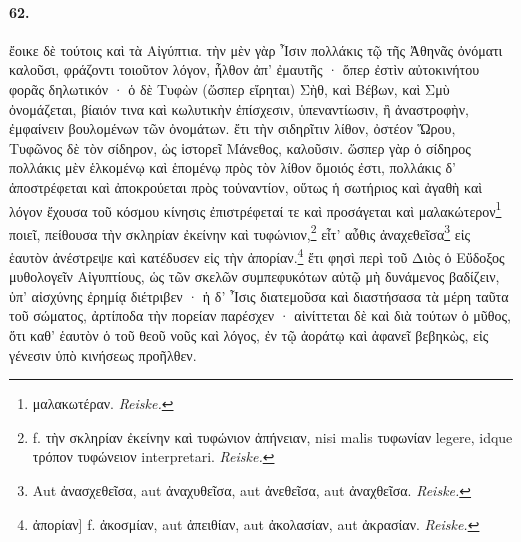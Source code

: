 \documentclass[a4paper, 11pt, oneside, polutonikogreek, german]{article}
\begin{document}
\paragraph{62.}
ἔοικε δὲ τούτοις καὶ τὰ Αἰγύπτια. τὴν μὲν γὰρ Ἶσιν πολλάκις τῷ τῆς Ἀθηνᾶς ὀνόματι καλοῦσι, φράζοντι τοιοῦτον λόγον, ἦλθον ἀπ' ἐμαυτῆς · ὅπερ ἐστὶν αὐτοκινήτου φορᾶς δηλωτικόν · ὁ δὲ Τυφὼν (ὥσπερ εἴρηται) Σὴθ, καὶ Βέβων, καὶ Σμὺ ὀνομάζεται, βίαιόν τινα καὶ κωλυτικὴν ἐπίσχεσιν, ὑπεναντίωσιν, ἢ ἀναστροφὴν, ἐμφαίνειν βουλομένων τῶν ὀνομάτων. ἔτι τὴν σιδηρῖτιν λίθον, ὀστέον Ὥρου, Τυφῶνος δὲ τὸν σίδηρον, ὡς ἱστορεῖ Μάνεθος, καλοῦσιν. ὥσπερ γὰρ ὁ σίδηρος πολλάκις μὲν ἑλκομένῳ καὶ ἑπομένῳ πρὸς τὸν λίθον ὅμοιός ἐστι, πολλάκις δ' ἀποστρέφεται καὶ ἀποκρούεται πρὸς τοὐναντίον, οὕτως ἡ σωτήριος καὶ ἀγαθὴ καὶ λόγον ἔχουσα τοῦ κόσμου κίνησις ἐπιστρέφεταί τε καὶ προσάγεται καὶ μαλακώτερον\footnote{μαλακωτέραν. \emph{Reiske.}} ποιεῖ, πείθουσα τὴν σκληρίαν ἐκείνην καὶ τυφώνιον,\footnote{f. τὴν σκληρίαν ἐκείνην καὶ τυφώνιον ἀπήνειαν, nisi malis τυφωνίαν legere, idque τρόπον τυφώνειον interpretari. \emph{Reiske.}} εἶτ' αὖθις ἀναχεθεῖσα\footnote{Aut ἀνασχεθεῖσα, aut ἀναχυθεῖσα, aut ἀνεθεῖσα, aut ἀναχθεῖσα. \emph{Reiske.}} εἰς ἑαυτὸν ἀνέστρεψε καὶ κατέδυσεν εἰς τὴν ἀπορίαν.\footnote{ἀπορίαν] f. ἀκοσμίαν, aut ἀπειθίαν, aut ἀκολασίαν, aut ἀκρασίαν. \emph{Reiske.}} ἔτι φησὶ περὶ τοῦ Διὸς ὁ Εὔδοξος μυθολογεῖν Αἰγυπτίους, ὡς τῶν σκελῶν συμπεφυκότων αὐτῷ μὴ δυνάμενος βαδίζειν, ὑπ' αἰσχύνης ἐρημίᾳ διέτριβεν · ἡ δ' Ἶσις διατεμοῦσα καὶ διαστήσασα τὰ μέρη ταῦτα τοῦ σώματος, ἀρτίποδα τὴν πορείαν παρέσχεν · αἰνίττεται δὲ καὶ διὰ τούτων ὁ μῦθος, ὅτι καθ' ἑαυτὸν ὁ τοῦ θεοῦ νοῦς καὶ λόγος, ἐν τῷ ἀοράτῳ καὶ ἀφανεῖ βεβηκὼς, εἰς γένεσιν ὑπὸ κινήσεως προῆλθεν.
\end{document}
